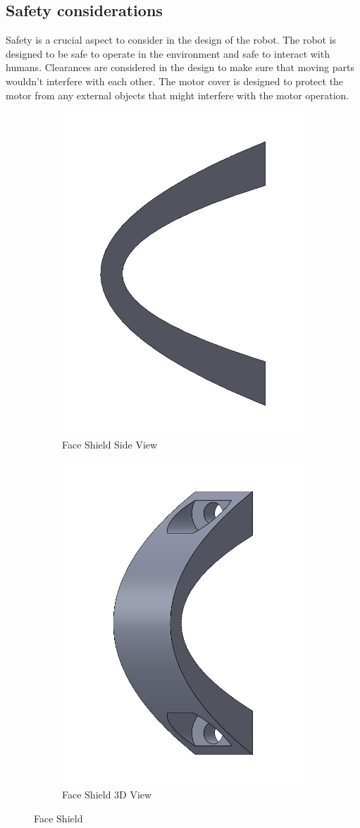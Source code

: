 \subsection{Safety considerations}
Safety is a crucial aspect to consider in the design of the robot.
The robot is designed to be safe to operate in the environment and safe to interact with humans.
Clearances are considered in the design to make sure that moving parts wouldn't interfere with each other.
The motor cover is designed to protect the motor from any external objects that might interfere with the motor operation.
\begin{figure}[h]
	\centering
	\begin{subfigure}[b]{0.4\textwidth}
		\centering
		\includegraphics[width=.5\linewidth]{Support_flexible_1}
		\caption{Face Shield Side View}
		\label{fig:face shield side view}
	\end{subfigure}
	\hfill
	\begin{subfigure}[b]{0.4\textwidth}
		\centering
		\includegraphics[width=.5\linewidth]{Support_flexible_2}
		\caption{Face Shield 3D View}
		\label{fig:faseshield3dview}
	\end{subfigure}
	\caption{Face Shield}
	\label{fig:faceshield}
\end{figure}

